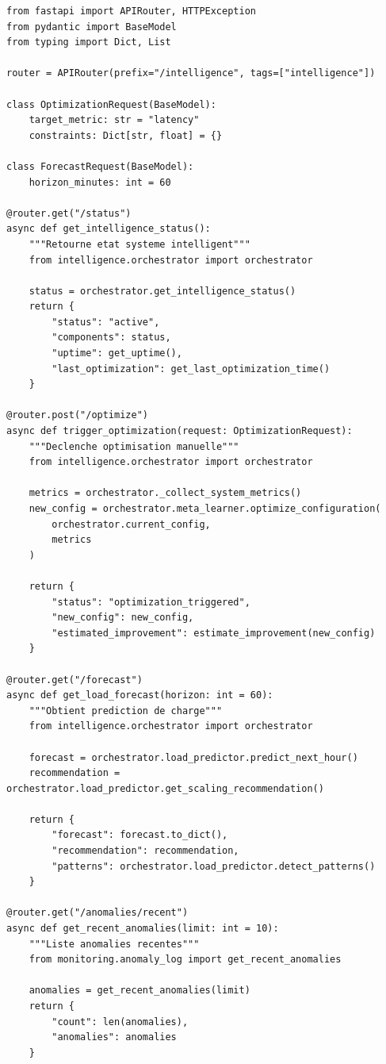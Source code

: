 \documentclass[12pt,a4paper]{article}
\begin{document}
\begin{lstlisting}[caption={api/intelligent\_routes.py}]
from fastapi import APIRouter, HTTPException
from pydantic import BaseModel
from typing import Dict, List

router = APIRouter(prefix="/intelligence", tags=["intelligence"])

class OptimizationRequest(BaseModel):
    target_metric: str = "latency"
    constraints: Dict[str, float] = {}

class ForecastRequest(BaseModel):
    horizon_minutes: int = 60

@router.get("/status")
async def get_intelligence_status():
    """Retourne etat systeme intelligent"""
    from intelligence.orchestrator import orchestrator
    
    status = orchestrator.get_intelligence_status()
    return {
        "status": "active",
        "components": status,
        "uptime": get_uptime(),
        "last_optimization": get_last_optimization_time()
    }

@router.post("/optimize")
async def trigger_optimization(request: OptimizationRequest):
    """Declenche optimisation manuelle"""
    from intelligence.orchestrator import orchestrator
    
    metrics = orchestrator._collect_system_metrics()
    new_config = orchestrator.meta_learner.optimize_configuration(
        orchestrator.current_config,
        metrics
    )
    
    return {
        "status": "optimization_triggered",
        "new_config": new_config,
        "estimated_improvement": estimate_improvement(new_config)
    }

@router.get("/forecast")
async def get_load_forecast(horizon: int = 60):
    """Obtient prediction de charge"""
    from intelligence.orchestrator import orchestrator
    
    forecast = orchestrator.load_predictor.predict_next_hour()
    recommendation = orchestrator.load_predictor.get_scaling_recommendation()
    
    return {
        "forecast": forecast.to_dict(),
        "recommendation": recommendation,
        "patterns": orchestrator.load_predictor.detect_patterns()
    }

@router.get("/anomalies/recent")
async def get_recent_anomalies(limit: int = 10):
    """Liste anomalies recentes"""
    from monitoring.anomaly_log import get_recent_anomalies
    
    anomalies = get_recent_anomalies(limit)
    return {
        "count": len(anomalies),
        "anomalies": anomalies
    }


\end{lstlisting}
\end{document}
